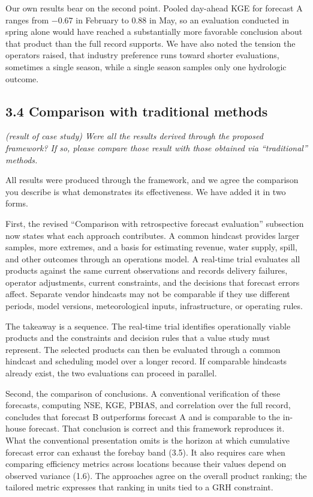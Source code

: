 \documentclass[11pt]{article}
\newenvironment{rc}%
  {\begin{list}{}{\setlength{\leftmargin}{1.5em}\setlength{\rightmargin}{1.5em}%
   \setlength{\topsep}{0.2em}\setlength{\parsep}{0pt}\setlength{\itemsep}{0pt}}%
   \item[]\itshape\color{quotegray}}%
  {\end{list}}
\begin{document}
Our own results bear on the second point. Pooled day-ahead KGE for forecast A ranges from
$-0.67$ in February to 0.88 in May, so an evaluation conducted in spring alone would have reached
a substantially more favorable conclusion about that product than the full record supports. We
have also noted the tension the operators raised, that industry preference runs toward shorter
evaluations, sometimes a single season, while a single season samples only one hydrologic
outcome.

\subsection*{3.4 Comparison with traditional methods}

\begin{rc}
(result of case study) Were all the results derived through the proposed framework? If so,
please compare those result with those obtained via ``traditional'' methods.
\end{rc}

All results were produced through the framework, and we agree the comparison you describe is what
demonstrates its effectiveness. We have added it in two forms.

First, the revised ``Comparison with retrospective forecast evaluation'' subsection now states
what each approach contributes. A common hindcast provides larger samples, more extremes, and a
basis for estimating revenue, water supply, spill, and other outcomes through an operations model.
A real-time trial evaluates all products against the same current observations and records delivery
failures, operator adjustments, current constraints, and the decisions that forecast errors affect.
Separate vendor hindcasts may not be comparable if they use different periods, model versions,
meteorological inputs, infrastructure, or operating rules.

The takeaway is a sequence. The real-time trial identifies operationally viable products and the
constraints and decision rules that a value study must represent. The selected products can then
be evaluated through a common hindcast and scheduling model over a longer record. If comparable
hindcasts already exist, the two evaluations can proceed in parallel.

Second, the comparison of conclusions. A conventional verification of these forecasts, computing
NSE, KGE, PBIAS, and correlation over the full record, concludes that forecast B outperforms
forecast A and is comparable to the in-house forecast. That conclusion is correct and this
framework reproduces it. What the conventional presentation omits is the horizon at which
cumulative forecast error can exhaust the forebay band (3.5). It also requires care when
comparing efficiency metrics across locations because their values depend on observed variance
(1.6). The approaches agree on the overall product ranking; the tailored metric expresses that
ranking in units tied to a GRH constraint.
\end{document}
